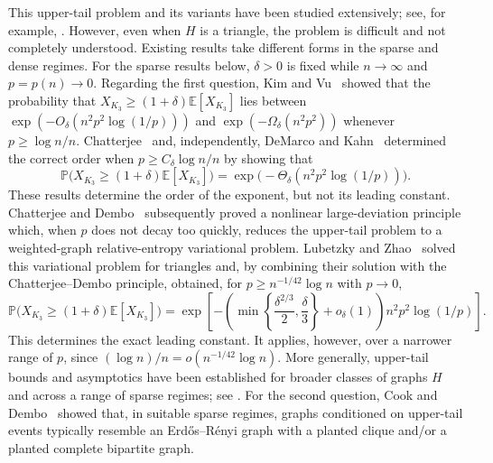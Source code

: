 This upper-tail problem and its variants have been studied extensively; see, for example,
\cite{BhattacharyaDembo2021,ChatterjeeMissingLog,DeMarcoKahnTriangles,
ganguly2024upper,Janson2004uppertail,JansonRucinskiInfamous,Raz2020Cycles,Sileikis2020Stars,Vu2001}.
However, even when $H$ is a triangle, the problem is difficult and not
completely understood.  Existing results take different forms in the sparse
and dense regimes.  For the sparse results below, $\delta>0$ is fixed while
$n\to\infty$ and $p=p(n)\to0$.  Regarding the first question,
Kim and Vu~\cite{KimVu2004} showed that the probability that
$X_{K_3}\ge(1+\delta)\mathbb{E}[X_{K_3}]$ lies between
$\exp(-O_\delta(n^2p^2 \log(1/p)))$ and $\exp(-\Omega_\delta(n^2p^2))$ whenever $p\ge\log n/n$.
Chatterjee~\cite{ChatterjeeMissingLog} and, independently, DeMarco and
Kahn~\cite{DeMarcoKahnTriangles} determined the correct order when $p \ge C_\delta \log n/n$ by showing that 
\[
  \mathbb{P}\bigl(X_{K_3}\ge(1+\delta)\mathbb{E}[X_{K_3}]\bigr)
  =\exp\bigl(-\Theta_\delta(n^2p^2\log(1/p))\bigr).
\]
These results determine the order of the exponent,
but not its leading constant.  Chatterjee
and Dembo~\cite{ChatterjeeDemboNonlinear} subsequently proved a nonlinear
large-deviation principle which, when $p$ does not decay too quickly, reduces
the upper-tail problem to a weighted-graph relative-entropy variational
problem.
Lubetzky and Zhao~\cite{LubetzkyZhaoSparse} solved this variational problem for
triangles and, by combining their solution with the Chatterjee--Dembo
principle, obtained, for $p\ge n^{-1/42}\log n$ with $p\to0$,
\[
  \mathbb{P}\bigl(X_{K_3}\ge(1+\delta)\mathbb{E}[X_{K_3}]\bigr)
  =
  \exp\left[
    -\left(
      \min\left\{\frac{\delta^{2/3}}2,\frac{\delta}{3}\right\}
      +o_\delta(1)
    \right)n^2p^2\log(1/p)
  \right].
\]
This determines the exact leading constant.  It applies, however, over a
narrower range of $p$, since $(\log n)/n=o(n^{-1/42}\log n)$.
More generally, upper-tail bounds and asymptotics have been established
for broader classes of graphs \(H\) and across a range of sparse regimes;
see \cite{Augeri2020,BasakBasu2023,BhattacharyaGangulyLubetzkyZhao,
CookDembo2020,CookDemboPham2024,DeMarcoKahnCliques,Eldan2018,HarelMoussetSamotij2022}.
For the second question,  Cook and Dembo~\cite{CookDembo2024Structure}
showed that, in suitable sparse regimes, graphs conditioned on upper-tail
events typically resemble an Erd\H{o}s--R\'enyi graph with a planted clique
and/or a planted complete bipartite graph.

